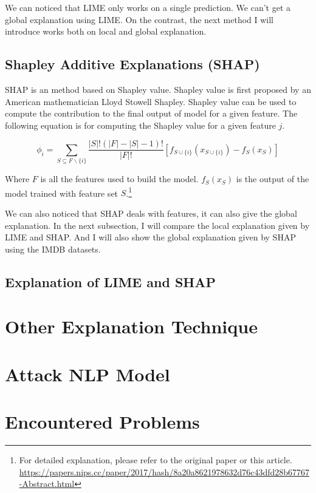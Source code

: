 \documentclass{article}[12pt]
\begin{document}
We can noticed that LIME only works on a single prediction. We can't get a global explanation using LIME. On the contrast, the next method I will introduce works both on local and global explanation.

\subsection{Shapley Additive Explanations (SHAP)}

SHAP is an method based on Shapley value. Shapley value is first proposed by an American mathematician Lloyd Stowell Shapley. Shapley value can be used to compute the contribution to the final output of model for a given feature. The following equation is for computing the Shapley value for a given feature $j$.

\begin{equation}
\phi_{i}=\sum_{S \subseteq F \backslash\{i\}} \frac{|S| !(|F|-|S|-1) !}{|F| !}\left[f_{S \cup\{i\}}\left(x_{S \cup\{i\}}\right)-f_{S}\left(x_{S}\right)\right]
\end{equation}

Where $F$ is all the features used to build the model. $f_{S}(x_{S})$ is the output of the model trained with feature set $S$.\footnote{For detailed explanation, please refer to the original paper or this article. \url{https://papers.nips.cc/paper/2017/hash/8a20a8621978632d76c43dfd28b67767-Abstract.html}}

We can also noticed that SHAP deals with features, it can also give the global explanation. In the next subsection, I will compare the local explanation given by LIME and SHAP. And I will also show the global explanation given by SHAP using the IMDB datasets.

\subsection{Explanation of LIME and SHAP}

\section{Other Explanation Technique}

\section{Attack NLP Model}

\section{Encountered Problems}
\end{document}
